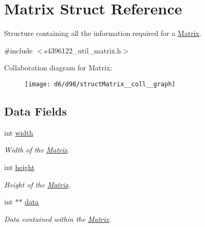 \hypertarget{structMatrix}{}\section{Matrix Struct Reference}
\label{structMatrix}


Structure containing all the information required for a \hyperlink{structMatrix}{Matrix}.  




{\ttfamily \#include $<$s4396122\+\_\+util\+\_\+matrix.\+h$>$}



Collaboration diagram for Matrix\+:\nopagebreak
\begin{figure}[H]
\begin{center}
\leavevmode
\texttt{[image: d6/d98/structMatrix\_\_coll\_\_graph]}
\end{center}
\end{figure}
\subsection*{Data Fields}
\begin{DoxyCompactItemize}
\item 
int \hyperlink{structMatrix_ad4320bd2dc03fd11887d3ba350c6c8ef}{width}\hypertarget{structMatrix_ad4320bd2dc03fd11887d3ba350c6c8ef}{}\label{structMatrix_ad4320bd2dc03fd11887d3ba350c6c8ef}

\begin{DoxyCompactList}\small\item\em Width of the \hyperlink{structMatrix}{Matrix}. \end{DoxyCompactList}\item 
int \hyperlink{structMatrix_a0b5614256a04ece0ea54b8aad7e6980c}{height}\hypertarget{structMatrix_a0b5614256a04ece0ea54b8aad7e6980c}{}\label{structMatrix_a0b5614256a04ece0ea54b8aad7e6980c}

\begin{DoxyCompactList}\small\item\em Height of the \hyperlink{structMatrix}{Matrix}. \end{DoxyCompactList}\item 
int $\ast$$\ast$ \hyperlink{structMatrix_afda04dbb307a169b4235dba98fb5b9df}{data}\hypertarget{structMatrix_afda04dbb307a169b4235dba98fb5b9df}{}\label{structMatrix_afda04dbb307a169b4235dba98fb5b9df}

\begin{DoxyCompactList}\small\item\em Data contained within the \hyperlink{structMatrix}{Matrix}. \end{DoxyCompactList}\end{DoxyCompactItemize}


